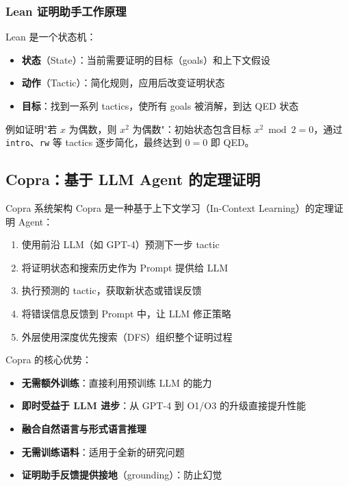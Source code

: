 \documentclass[a4paper]{article}
\begin{document}
\subsubsection{Lean 证明助手工作原理}

Lean 是一个状态机：
\begin{itemize}
    \item \textbf{状态}（State）：当前需要证明的目标（goals）和上下文假设
    \item \textbf{动作}（Tactic）：简化规则，应用后改变证明状态
    \item \textbf{目标}：找到一系列 tactics，使所有 goals 被消解，到达 QED 状态
\end{itemize}

例如证明"若 $x$ 为偶数，则 $x^2$ 为偶数"：初始状态包含目标 $x^2 \bmod 2 = 0$，通过 \texttt{intro}、\texttt{rw} 等 tactics 逐步简化，最终达到 $0 = 0$ 即 QED。

\subsection{Copra：基于 LLM Agent 的定理证明}

\begin{importantbox}{Copra 系统架构}
Copra 是一种基于上下文学习（In-Context Learning）的定理证明 Agent：
\begin{enumerate}
    \item 使用前沿 LLM（如 GPT-4）预测下一步 tactic
    \item 将证明状态和搜索历史作为 Prompt 提供给 LLM
    \item 执行预测的 tactic，获取新状态或错误反馈
    \item 将错误信息反馈到 Prompt 中，让 LLM 修正策略
    \item 外层使用深度优先搜索（DFS）组织整个证明过程
\end{enumerate}
\end{importantbox}

Copra 的核心优势：
\begin{itemize}
    \item \textbf{无需额外训练}：直接利用预训练 LLM 的能力
    \item \textbf{即时受益于 LLM 进步}：从 GPT-4 到 O1/O3 的升级直接提升性能
    \item \textbf{融合自然语言与形式语言推理}
    \item \textbf{无需训练语料}：适用于全新的研究问题
    \item \textbf{证明助手反馈提供接地}（grounding）：防止幻觉
\end{itemize}
\end{document}
